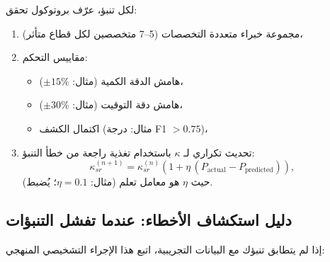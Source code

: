 \documentclass[13pt,a4paper]{article}
\begin{document}
	لكل تنبؤ، عرّف بروتوكول تحقق:
	\begin{enumerate}[leftmargin=*]
		\item مجموعة خبراء متعددة التخصصات (5--7 متخصصين لكل قطاع متأثر)،
		\item مقاييس التحكم:
		\begin{itemize}[leftmargin=*]
			\item هامش الدقة الكمية (مثال: $\pm 15\%$)،
			\item هامش دقة التوقيت (مثال: $\pm 30\%$)،
			\item اكتمال الكشف (مثال: درجة F1 $>0.75$)،
		\end{itemize}
		\item تحديث تكراري لـ $\kappa$ باستخدام تغذية راجعة من خطأ التنبؤ:
		\[
		\kappa_{sr}^{(n+1)}=\kappa_{sr}^{(n)}\left(1+\eta\,(P_{\mathrm{actual}}-P_{\mathrm{predicted}})\right),
		\]
		حيث $\eta$ هو معامل تعلم (مثال: $\eta=0.1$؛ يُضبط).
	\end{enumerate}
	
	\subsection*{دليل استكشاف الأخطاء: عندما تفشل التنبؤات}
	
	إذا لم يتطابق تنبؤك مع البيانات التجريبية، اتبع هذا الإجراء التشخيصي المنهجي:
	
\end{document}
